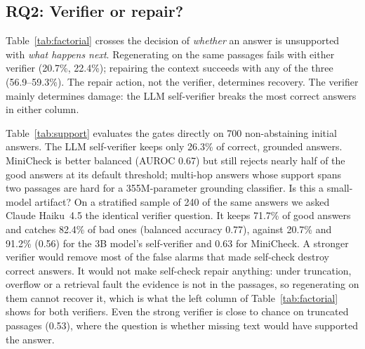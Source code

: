 \subsection{RQ2: Verifier or repair?}
Table~\ref{tab:factorial} crosses the decision of \emph{whether} an answer is unsupported with
\emph{what happens next}. Regenerating on the same passages fails with either verifier
(20.7\%, 22.4\%); repairing the context succeeds with any of the three (56.9--59.3\%). The repair
action, not the verifier, determines recovery. The verifier mainly determines damage: the LLM
self-verifier breaks the most correct answers in either column.

Table~\ref{tab:support} evaluates the gates directly on 700 non-abstaining initial answers. The LLM
self-verifier keeps only 26.3\% of correct, grounded answers. MiniCheck is better balanced (AUROC
0.67) but still rejects nearly half of the good answers at its default threshold; multi-hop answers
whose support spans two passages are hard for a 355M-parameter grounding classifier.
Is this a small-model artifact? On a stratified sample of 240 of the same answers we asked Claude
Haiku~4.5 the identical verifier question. It keeps 71.7\% of good answers and catches 82.4\% of bad
ones (balanced accuracy 0.77), against 20.7\% and 91.2\% (0.56) for the 3B model's self-verifier and
0.63 for MiniCheck. A stronger verifier would remove most of the false alarms that made self-check
destroy correct answers. It would not make self-check repair anything: under truncation, overflow
or a retrieval fault the evidence is not in the passages, so regenerating on them cannot recover
it, which is what the left column of Table~\ref{tab:factorial} shows for both verifiers. Even the
strong verifier is close to chance on truncated passages (0.53), where the question is whether
missing text would have supported the answer.

\begin{table}[t]
\caption{Verifier $\times$ repair. Cells: success under faults / clean damage (\%).}\label{tab:factorial}
\small

\end{table}

\begin{table}[t]
\caption{Support checks as gates on initial answers. Good kept: correct, grounded answers judged
supported. Bad caught: other answers judged unsupported.}\label{tab:support}
\small

\end{table}

